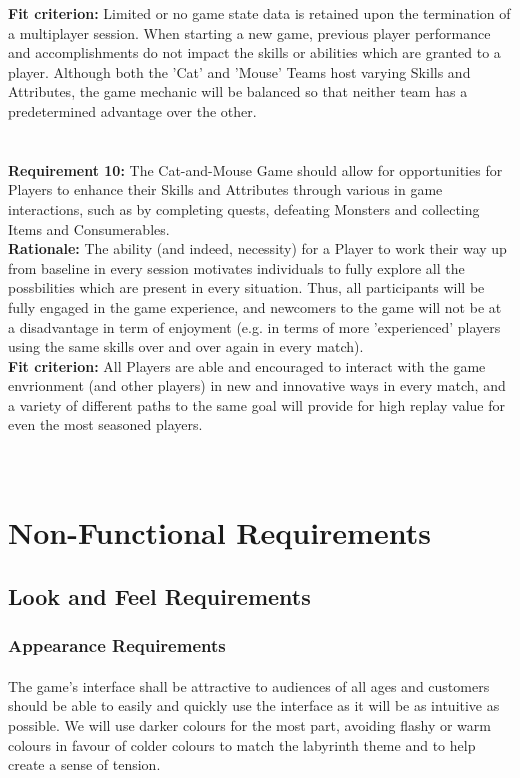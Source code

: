 \documentclass[12pt, titlepage]{article}
\begin{document}
\textbf{Fit criterion:}  Limited or no game state data is retained upon the termination of a multiplayer session. When starting a new game, previous player performance and accomplishments do not impact the skills or abilities which are granted to a player. Although both the 'Cat' and 'Mouse' Teams host varying Skills and Attributes, the game mechanic will be balanced so that neither team has a predetermined advantage over the other.\\
\\\\
\textbf{Requirement 10:}  The Cat-and-Mouse Game should allow for opportunities for Players to enhance their Skills and Attributes through various in game interactions, such as by completing quests, defeating Monsters and collecting Items and Consumerables.   \\
\textbf{Rationale:}  The ability (and indeed, necessity) for a Player to work their way up from baseline in every session motivates individuals to fully explore all the possbilities which are present in every situation. Thus, all participants will be fully engaged in the game experience, and newcomers to the game will not be at a disadvantage in term of enjoyment (e.g. in terms of more 'experienced' players using the same skills over and over again in every match).\\
\textbf{Fit criterion:}  All Players are able and encouraged to interact with the game envrionment (and other players) in new and innovative ways in every match, and a variety of different paths to the same goal will provide for high replay value for even the most seasoned players.\\
\\\\
\section{Non-Functional Requirements}
\subsection{Look and Feel Requirements}
\subsubsection{Appearance Requirements}
\paragraph{}The game's interface shall be attractive to audiences of all ages and customers should be able to easily and quickly use the interface as it will be as intuitive as possible. We will use darker colours for the most part, avoiding flashy or warm colours in favour of colder colours to match the labyrinth theme and to help create a sense of tension.  
\end{document}
